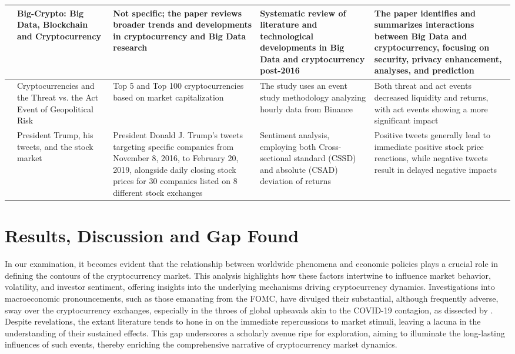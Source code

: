 \documentclass{article}
\begin{document}
\begin{longtable}{|p{2.0cm}|p{2cm}|p{2.5cm}|p{3.8cm}|p{5.0cm}|}
\cite{hassani2018bigcrypto} & Big-Crypto: Big Data, Blockchain and Cryptocurrency & Not specific; the paper reviews broader trends and developments in cryptocurrency and Big Data research & Systematic review of literature and technological developments in Big Data and cryptocurrency post-2016 & The paper identifies and summarizes interactions between Big Data and cryptocurrency, focusing on security, privacy enhancement, analyses, and prediction \\
\hline
\cite{kamal2023cryptocurrencies} & Cryptocurrencies and the Threat vs. the Act Event of Geopolitical Risk & Top 5 and Top 100 cryptocurrencies based on market capitalization & The study uses an event study methodology analyzing hourly data from Binance & Both threat and act events decreased liquidity and returns, with act events showing a more significant impact \\
\hline
\cite{naifar2023president} & President Trump, his tweets, and the stock market & President Donald J. Trump's tweets targeting specific companies from November 8, 2016, to February 20, 2019, alongside daily closing stock prices for 30 companies listed on 8 different stock exchanges & Sentiment analysis, employing both Cross-sectional standard (CSSD) and absolute (CSAD) deviation of returns & Positive tweets generally lead to immediate positive stock price reactions, while negative tweets result in delayed negative impacts \\
\hline

 \end{longtable}

\section{Results, Discussion and Gap Found}

In our examination, it becomes evident that the relationship between worldwide phenomena and economic policies plays a crucial role in defining the contours of the cryptocurrency market. This analysis highlights how these factors intertwine to influence market behavior, volatility, and investor sentiment, offering insights into the underlying mechanisms driving cryptocurrency dynamics. Investigations into macroeconomic pronouncements, such as those emanating from the FOMC, have divulged their substantial, although frequently adverse, sway over the cryptocurrency exchanges, especially in the throes of global upheavals akin to the COVID-19 contagion, as dissected by \cite{jarboui2021}.  Despite revelations, the extant literature tends to hone in on the immediate repercussions to market stimuli, leaving a lacuna in the understanding of their sustained effects. This gap underscores a scholarly avenue ripe for exploration, aiming to illuminate the long-lasting influences of such events, thereby enriching the comprehensive narrative of cryptocurrency market dynamics.
\end{document}

